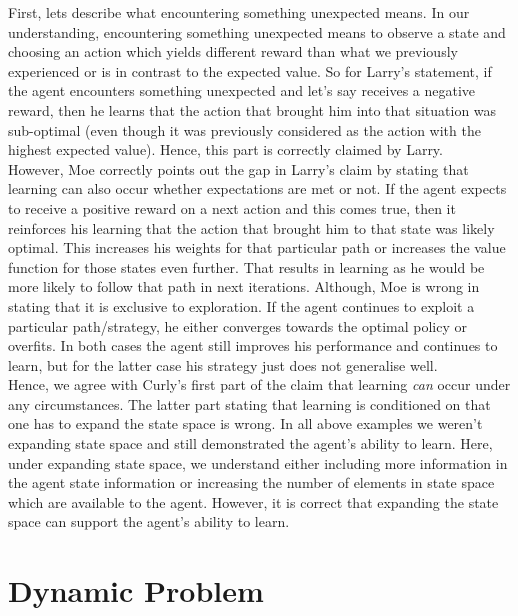 \documentclass{article}
\begin{document}
First, lets describe what encountering something unexpected means. 
In our understanding, encountering something unexpected means to observe a state and choosing an action which yields different reward than what we previously experienced or is in contrast to the expected value. So for Larry's statement, if the agent encounters something unexpected and let's say receives a negative reward, then he learns that the action that brought him into that situation was sub-optimal (even though it was previously considered as the action with the highest expected value). Hence, this part is correctly claimed by Larry. \\

However, Moe correctly points out the gap in Larry's claim by stating that learning can also occur whether expectations are met or not. If the agent expects to receive a positive reward on a next action and this comes true, then it reinforces his learning that the action that brought him to that state was likely optimal. This increases his weights for that particular path or increases the value function for those states even further. That results in learning as he would be more likely to follow that path in next iterations. Although,  Moe is wrong in stating that it is exclusive to exploration. If the agent continues to exploit a particular path/strategy, he either converges towards the optimal policy or overfits. In both cases the agent still improves his performance and continues to learn, but for the latter case his strategy just does not generalise well. \\

Hence, we agree with Curly's first part of the claim that learning \emph{can} occur under any circumstances. The latter part stating that learning is conditioned on that one has to expand the state space is wrong. In all above examples we weren't expanding state space and still demonstrated the agent's ability to learn. Here, under expanding state space, we understand either including more information in the agent state information or increasing the number of elements in state space which are available to the agent. However, it is correct that expanding the state space can support the agent's ability to learn. \newpage

\section{Dynamic Problem}

\end{document}
